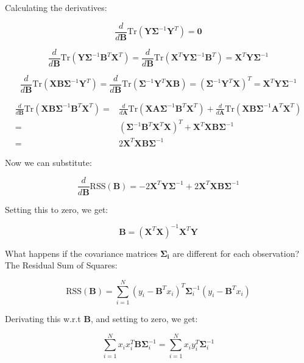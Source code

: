 \documentclass{article}
\begin{document}
Calculating the derivatives:

\[
\frac{d}{d\mathbf{B}}\text{Tr}(\mathbf{Y} \mathbf{\Sigma}^{-1} \mathbf{Y}^T) = \mathbf{0}
\]

\[
\frac{d}{d\mathbf{B}}\text{Tr}(\mathbf{Y} \mathbf{\Sigma}^{-1} \mathbf{B}^T \mathbf{X}^T) = \frac{d}{d\mathbf{B}}\text{Tr}(\mathbf{X}^T \mathbf{Y} \mathbf{\Sigma}^{-1} \mathbf{B}^T) = \mathbf{X}^T \mathbf{Y} \mathbf{\Sigma}^{-1}
\]

\[
\frac{d}{d\mathbf{B}}\text{Tr}(\mathbf{X}\mathbf{B}\mathbf{\Sigma}^{-1}\mathbf{Y}^T) = \frac{d}{d\mathbf{B}}\text{Tr}(\mathbf{\Sigma}^{-1}\mathbf{Y}^T\mathbf{X}\mathbf{B}) = (\mathbf{\Sigma}^{-1}\mathbf{Y}^T\mathbf{X})^T = \mathbf{X}^T \mathbf{Y} \mathbf{\Sigma}^{-1}
\]

\[
\begin{split}
\frac{d}{d\mathbf{B}}\text{Tr}(\mathbf{X} \mathbf{B} \mathbf{\Sigma}^{-1} \mathbf{B}^T \mathbf{X}^T) =& \frac{d}{d\mathbf{A}}\text{Tr}(\mathbf{X} \mathbf{A} \mathbf{\Sigma}^{-1} \mathbf{B}^T \mathbf{X}^T) + \frac{d}{d\mathbf{A}}\text{Tr}(\mathbf{X} \mathbf{B} \mathbf{\Sigma}^{-1} \mathbf{A}^T \mathbf{X}^T)\\
=& (\mathbf{\Sigma}^{-1} \mathbf{B}^T \mathbf{X}^T \mathbf{X})^T + \mathbf{X}^T \mathbf{X} \mathbf{B} \mathbf{\Sigma}^{-1}\\
=& 2\mathbf{X}^T \mathbf{X} \mathbf{B} \mathbf{\Sigma}^{-1}
\end{split}
\]

Now we can substitute:

\[
\frac{d}{d\mathbf{B}} \text{RSS}(\mathbf{B}) = -2 \mathbf{X}^T \mathbf{Y} \mathbf{\Sigma}^{-1} + 2\mathbf{X}^T \mathbf{X} \mathbf{B} \mathbf{\Sigma}^{-1}
\]

Setting this to zero, we get:

\[
\mathbf{B} = (\mathbf{X}^T\mathbf{X})^{-1}\mathbf{X}^T\mathbf{Y}
\]

What happens if the covariance matrices $\mathbf{\Sigma_i}$ are different for each observation? The Residual Sum of Squares:

\[
\text{RSS}(\mathbf{B}) = \sum_{i=1}^{N} (y_i - \mathbf{B}^Tx_i)^T \mathbf{\Sigma}^{-1}_i (y_i - \mathbf{B}^Tx_i)
\]

Derivating this w.r.t $\mathbf{B}$, and setting to zero, we get:

\[
\sum_{i=1}^{N} x_i x^T_i \mathbf{B} \mathbf{\Sigma}^{-1}_i = \sum_{i=1}^{N} x_i y^T_i \mathbf{\Sigma}^{-1}_i
\]
\end{document}
